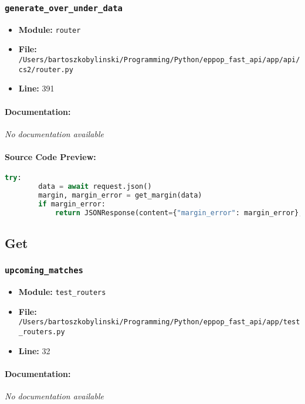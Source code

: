 \documentclass[11pt,a4paper]{article}
\begin{document}
\subsubsection{\texttt{generate\_over\_under\_data}}

\begin{itemize}
    \item \textbf{Module:} \texttt{router}
    \item \textbf{File:} \texttt{/Users/bartoszkobylinski/Programming/Python/eppop\_fast\_api/app/api/cs2/router.py}
    \item \textbf{Line:} 391
\end{itemize}

\paragraph{Documentation:} \textit{No documentation available}

\paragraph{Source Code Preview:}
\begin{lstlisting}[language=Python]
    try:
        data = await request.json()
        margin, margin_error = get_margin(data)
        if margin_error:
            return JSONResponse(content={"margin_error": margin_error}, status_code=400)
\end{lstlisting}

\vspace{1em}
\subsection{Get}

\subsubsection{\texttt{upcoming\_matches}}

\begin{itemize}
    \item \textbf{Module:} \texttt{test\_routers}
    \item \textbf{File:} \texttt{/Users/bartoszkobylinski/Programming/Python/eppop\_fast\_api/app/test\_routers.py}
    \item \textbf{Line:} 32
\end{itemize}

\paragraph{Documentation:} \textit{No documentation available}
\end{document}
